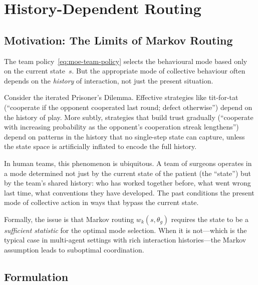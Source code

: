 \section{History-Dependent Routing}
\label{sec:history-routing}

\subsection{Motivation: The Limits of Markov Routing}
\label{subsec:markov-limits}

The team policy~\eqref{eq:moe-team-policy} selects the behavioural mode based only on the current state~$s$. But the appropriate mode of collective behaviour often depends on the \emph{history} of interaction, not just the present situation.

Consider the iterated Prisoner's Dilemma. Effective strategies like tit-for-tat (``cooperate if the opponent cooperated last round; defect otherwise'') depend on the history of play. More subtly, strategies that build trust gradually (``cooperate with increasing probability as the opponent's cooperation streak lengthens'') depend on patterns in the history that no single-step state can capture, unless the state space is artificially inflated to encode the full history.

In human teams, this phenomenon is ubiquitous. A team of surgeons operates in a mode determined not just by the current state of the patient (the ``state'') but by the team's shared history: who has worked together before, what went wrong last time, what conventions they have developed. The past conditions the present mode of collective action in ways that bypass the current state.

Formally, the issue is that Markov routing $w_k(s,\theta_g)$ requires the state to be a \emph{sufficient statistic} for the optimal mode selection. When it is not---which is the typical case in multi-agent settings with rich interaction histories---the Markov assumption leads to suboptimal coordination.

\subsection{Formulation}
\label{subsec:history-formulation}

